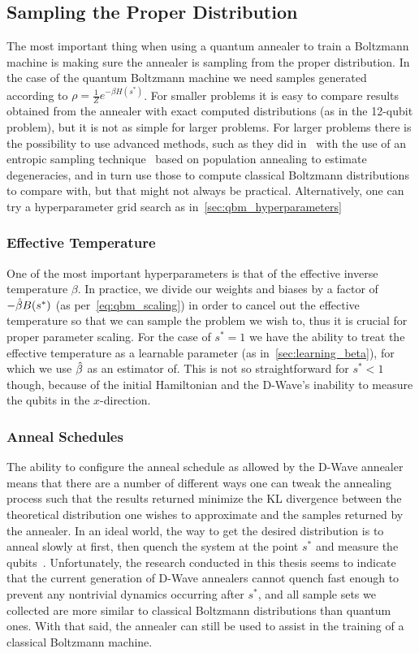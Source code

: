 \subsection{Sampling the Proper Distribution}
The most important thing when using a quantum annealer to train a Boltzmann machine is making sure the annealer is sampling from the proper distribution.
In the case of the quantum Boltzmann machine we need samples generated according to \( \rho = \frac{1}{Z} e^{-\beta H(s^*)} \).
For smaller problems it is easy to compare results obtained from the annealer with exact computed distributions (as in the 12-qubit problem), but it is not as simple for larger problems.
For larger problems there is the possibility to use advanced methods, such as they did in~\cite{marshall_2019} with the use of an entropic sampling technique~\cite{barash_2019} based on population annealing to estimate degeneracies, and in turn use those to compute classical Boltzmann distributions to compare with, but that might not always be practical.
Alternatively, one can try a hyperparameter grid search as in~\cref{sec:qbm_hyperparameters}

\subsubsection{Effective Temperature}
One of the most important hyperparameters is that of the effective inverse temperature \( \beta \).
In practice, we divide our weights and biases by a factor of \( -\hat{\beta} B(s^*) \) (as per~\cref{eq:qbm_scaling}) in order to cancel out the effective temperature so that we can sample the problem we wish to, thus it is crucial for proper parameter scaling.
For the case of \( s^* = 1 \) we have the ability to treat the effective temperature as a learnable parameter (as in~\cref{sec:learning_beta}), for which we use \( \hat{\beta} \) as an estimator of.
This is not so straightforward for \( s^* < 1 \) though, because of the initial Hamiltonian and the D-Wave's inability to measure the qubits in the \( x \)-direction.

\subsubsection{Anneal Schedules}
The ability to configure the anneal schedule as allowed by the D-Wave annealer means that there are a number of different ways one can tweak the annealing process such that the results returned minimize the KL divergence between the theoretical distribution one wishes to approximate and the samples returned by the annealer.
In an ideal world, the way to get the desired distribution is to anneal slowly at first, then quench the system at the point \( s^* \) and measure the qubits~\cite{amin_2018}.
Unfortunately, the research conducted in this thesis seems to indicate that the current generation of D-Wave annealers cannot quench fast enough to prevent any nontrivial dynamics occurring after \( s^* \), and all sample sets we collected are more similar to classical Boltzmann distributions than quantum ones.
With that said, the annealer can still be used to assist in the training of a classical Boltzmann machine.

